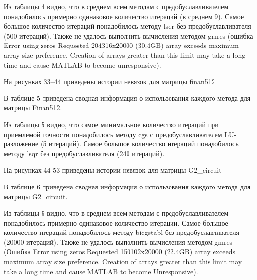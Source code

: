 

Из таблицы 4 видно, что в среднем всем методам с предобуславливателем понадобилось примерно одинаковое
количество итераций (в среднем 9).
Самое большое количество итераций понадобилось методу lsqr без предобуславливателя (500 итераций).
Также не удалось выполнить вычисления методом gmres (ошибка Error using zeros Requested 204316x20000 (30.4GB)
array exceeds maximum array size preference.
Creation of arrays greater than this limit may take a long time and cause MATLAB to become unresponsive).

На рисунках 33--44 приведены истории невязок для матрицы finan512



В таблице 5 приведена сводная информация о использования каждого метода для матрицы Finan512.



Из таблицы 5 видно, что самое минимальное количество итераций при
приемлемой точности понадобилось методу cgs с предобуславливателем LU-разложение (5 итераций).
Самое большое количество итераций понадобилось методу lsqr без предобуславливателя (240 итераций).

На рисунках 44-53 приведены истории невязок для матрицы G2\_circuit



В таблице 6 приведена сводная информация о использования каждого метода для матрицы G2\_circuit.



Из таблицы 6 видно, что в среднем всем методам с предобуславливателем понадобилось примерно одинаковое количество итерации.
Самое большое количество итераций понадобилось методу bicgstabl без предобуславливателя (20000 итераций).
Также не удалось выполнить вычисления методом gmres (Ошибка Error using zeros Requested 150102x20000 (22.4GB)
array exceeds maximum array size preference.
Creation of arrays greater than this limit may take a long time and cause MATLAB to become Unresponsive).